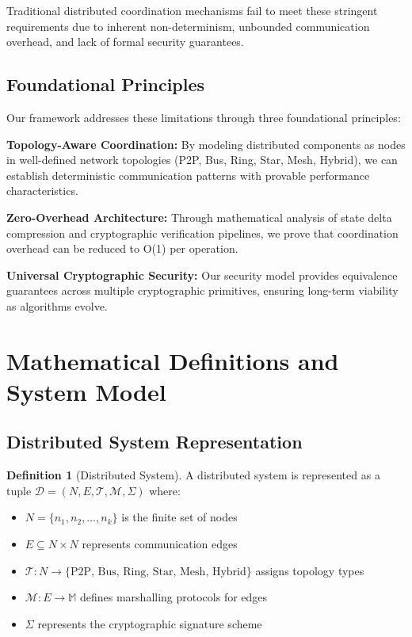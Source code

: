 \documentclass[11pt,a4paper]{article}
\theoremstyle{definition}
\newtheorem{definition}[theorem]{Definition}
\theoremstyle{remark}
\newcommand{\M}{\mathcal{M}}
\newcommand{\D}{\mathcal{D}}
\newcommand{\T}{\mathcal{T}}
\begin{document}
Traditional distributed coordination mechanisms fail to meet these stringent requirements due to inherent non-determinism, unbounded communication overhead, and lack of formal security guarantees.

\subsection{Foundational Principles}

Our framework addresses these limitations through three foundational principles:

\textbf{Topology-Aware Coordination:} By modeling distributed components as nodes in well-defined network topologies (P2P, Bus, Ring, Star, Mesh, Hybrid), we can establish deterministic communication patterns with provable performance characteristics.

\textbf{Zero-Overhead Architecture:} Through mathematical analysis of state delta compression and cryptographic verification pipelines, we prove that coordination overhead can be reduced to O(1) per operation.

\textbf{Universal Cryptographic Security:} Our security model provides equivalence guarantees across multiple cryptographic primitives, ensuring long-term viability as algorithms evolve.

\section{Mathematical Definitions and System Model}

\subsection{Distributed System Representation}

\begin{definition}[Distributed System]
A distributed system is represented as a tuple $\D = (N, E, \T, \M, \Sigma)$ where:
\begin{itemize}
    \item $N = \{n_1, n_2, \ldots, n_k\}$ is the finite set of nodes
    \item $E \subseteq N \times N$ represents communication edges
    \item $\T: N \rightarrow \{\text{P2P, Bus, Ring, Star, Mesh, Hybrid}\}$ assigns topology types
    \item $\M: E \rightarrow \mathbb{M}$ defines marshalling protocols for edges
    \item $\Sigma$ represents the cryptographic signature scheme
\end{itemize}
\end{definition}
\end{document}
